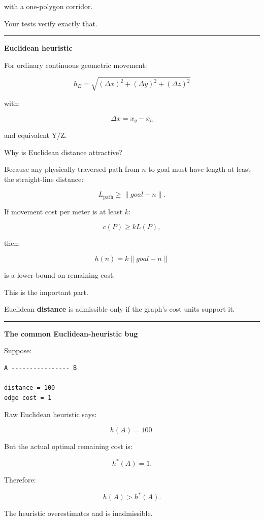 with a one-polygon corridor.

Your tests verify exactly that.

\begin{center}\rule{0.5\linewidth}{0.5pt}\end{center}

\textbf{Euclidean heuristic}

For ordinary continuous geometric movement:

\[
\boxed{
h_E=
\sqrt{
(\Delta x)^2+
(\Delta y)^2+
(\Delta z)^2
}
}
\]

with:

\[
\Delta x=x_g-x_n
\]

and equivalent Y/Z.

Why is Euclidean distance attractive?

Because any physically traversed path from \(n\) to goal must have length at least the straight-line distance:

\[
L_{\text{path}}
\ge
\|goal-n\|.
\]

If movement cost per meter is at least \(k\):

\[
c(P)\ge kL(P),
\]

then:

\[
h(n)=k\|goal-n\|
\]

is a lower bound on remaining cost.

This is the important part.

Euclidean \textbf{distance} is admissible only if the graph's cost units support it.

\begin{center}\rule{0.5\linewidth}{0.5pt}\end{center}

\textbf{The common Euclidean-heuristic bug}

Suppose:

\begin{verbatim}
A ---------------- B

distance = 100
edge cost = 1
\end{verbatim}

Raw Euclidean heuristic says:

\[
h(A)=100.
\]

But the actual optimal remaining cost is:

\[
h^*(A)=1.
\]

Therefore:

\[
h(A)>h^*(A).
\]

The heuristic overestimates and is inadmissible.

